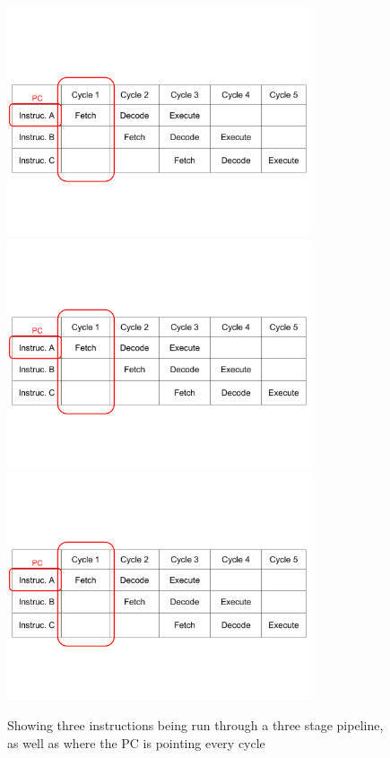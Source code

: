 \begin{figure}
  \centering
\includegraphics[page=1, clip=true, trim=1mm 40mm 1mm 57mm, width=0.8\textwidth]{./week2/pipeline}
\includegraphics[page=2, clip=true, trim=1mm 40mm 1mm 57mm, width=0.8\textwidth]{./week2/pipeline}
\includegraphics[page=3, clip=true, trim=1mm 40mm 1mm 57mm, width=0.8\textwidth]{./week2/pipeline}
\caption{Showing three instructions being run through a three stage pipeline, as well as where the PC is pointing every cycle}
\label{fig:pipeline}
\end{figure}

